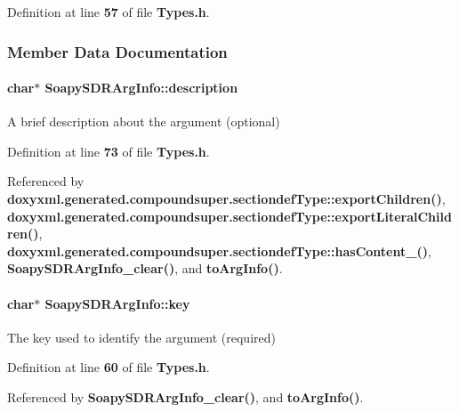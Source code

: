 Definition at line {\bf 57} of file {\bf Types.\+h}.



\subsubsection{Member Data Documentation}
\paragraph[{description}]{\setlength{\rightskip}{0pt plus 5cm}char$\ast$ Soapy\+S\+D\+R\+Arg\+Info\+::description}\label{structSoapySDRArgInfo_afca2eb0168826d1bbf40f3f8316ce47f}


A brief description about the argument (optional) 



Definition at line {\bf 73} of file {\bf Types.\+h}.



Referenced by {\bf doxyxml.\+generated.\+compoundsuper.\+sectiondef\+Type\+::export\+Children()}, {\bf doxyxml.\+generated.\+compoundsuper.\+sectiondef\+Type\+::export\+Literal\+Children()}, {\bf doxyxml.\+generated.\+compoundsuper.\+sectiondef\+Type\+::has\+Content\+\_\+()}, {\bf Soapy\+S\+D\+R\+Arg\+Info\+\_\+clear()}, and {\bf to\+Arg\+Info()}.

\paragraph[{key}]{\setlength{\rightskip}{0pt plus 5cm}char$\ast$ Soapy\+S\+D\+R\+Arg\+Info\+::key}\label{structSoapySDRArgInfo_af4b847e8da89c1025e198735ed4af95e}


The key used to identify the argument (required) 



Definition at line {\bf 60} of file {\bf Types.\+h}.



Referenced by {\bf Soapy\+S\+D\+R\+Arg\+Info\+\_\+clear()}, and {\bf to\+Arg\+Info()}.

